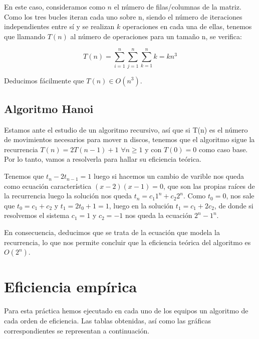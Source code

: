 \documentclass{homework}
\begin{document}
    En este caso, consideramos como $n$ el número de filas/columnas de la matriz. Como los tres bucles iteran cada uno sobre n, siendo el número de iteraciones
    independientes entre sí y se realizan $k$ operaciones en cada una de ellas, tenemos que llamando $T(n)$ al número de operaciones para un tamaño n, se verifica:
    
    \begin{equation*}
        T(n) = \sum_{i=1}^n \sum_{j=1}^{n} \sum_{k=1}^{n} k = kn^3
    \end{equation*}

    Deducimos fácilmente que $T(n) \in O(n^3)$. 
    
    \subsection{Algoritmo Hanoi}
    
     

    Estamos ante el estudio de un algoritmo recursivo, así que si T(n) es el número de movimientos necesarios para mover n discos, tenemos que el algoritmo sigue la 
    recurrencia $T(n) = 2T(n-1) + 1$ $\forall n \geq 1$ y con $T(0) = 0$ como caso base. Por lo tanto, vamos a resolverla para hallar su eficiencia teórica.

    Tenemos que $t_n - 2t_{n-1} = 1 $ luego si hacemos un cambio de varible nos queda como ecuación característica $(x-2)(x-1) = 0$, que son las propias raíces de la 
    recurrencia luego la solución nos queda $t_n = c_1 1^n  + c_2 2^n  $. Como $t_0=0$, nos sale que $t_0 = c_1 + c_2$ y $t_1 = 2 t_0 + 1 = 1$, luego en la 
    solución $t_1=c_1 + 2 c_2 $, de donde si resolvemos el sistema $c_1 = 1$ y $c_2 = -1$ nos queda la ecuación $2^n - 1^n$. 
    
    En consecuencia, deducimos que se trata de la ecuación que 
    modela la recurrencia, lo que nos permite concluir que la eficiencia teórica del algoritmo es $O(2^n)$.

    \section{Eficiencia empírica}

    Para esta práctica hemos ejecutado en cada uno de los equipos un algoritmo de cada orden de eficiencia.
    Las tablas obtenidas, así como las gráficas correspondientes se representan a continuación.
\end{document}
